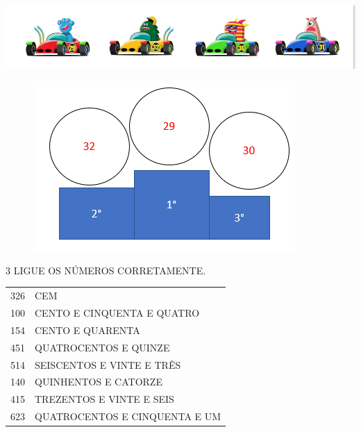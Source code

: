
\includegraphics[width=\textwidth]{media/image3.png}

\begin{figure}[htpb!]
\centering
\includegraphics[width=3.92763in,height=2.54202in]{media/image4.png}
\end{figure}


\num{3} LIGUE OS NÚMEROS CORRETAMENTE.

\begin{longtable}[]{@{}ll@{}}
\toprule
326 & CEM\tabularnewline
100 & CENTO E CINQUENTA E QUATRO\tabularnewline
154 & CENTO E QUARENTA\tabularnewline
451 & QUATROCENTOS E QUINZE\tabularnewline
514 & SEISCENTOS E VINTE E TRÊS\tabularnewline
140 & QUINHENTOS E CATORZE\tabularnewline
415 & TREZENTOS E VINTE E SEIS\tabularnewline
623 & QUATROCENTOS E CINQUENTA E UM\tabularnewline
\bottomrule
\end{longtable}


